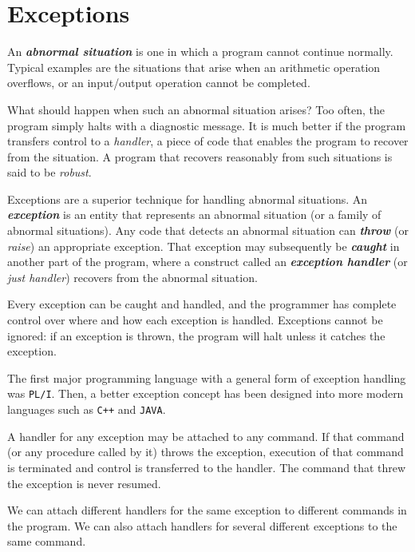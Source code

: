 \section{Exceptions}
\label{sec:exceptions}

An \textit{\textbf{abnormal situation}} is one in which a program cannot continue normally. Typical examples are the situations that arise when an arithmetic operation overflows, or an input/output operation cannot be completed.

What should happen when such an abnormal situation arises? Too often, the program simply halts with a diagnostic message. It is much better if the program transfers control to a \textit{handler}, a piece of code that enables the program to recover from the situation. A program that recovers reasonably from such situations is said to be \textit{robust}.

Exceptions are a superior technique for handling abnormal situations. An \textit{\textbf{exception}} is an entity that represents an abnormal situation (or a family of abnormal situations). Any code that detects an abnormal situation can \textit{\textbf{throw}} (or \textit{raise}) an appropriate exception. That exception may subsequently be \textit{\textbf{caught}} in another part of the program, where a construct called an \textit{\textbf{exception handler}} (or \textit{just handler}) recovers from the abnormal situation.

Every exception can be caught and handled, and the programmer has complete control over where and how each exception is handled. Exceptions cannot be ignored: if an exception is thrown, the program will halt unless it catches the exception.

The first major programming language with a general form of exception handling was \texttt{PL/I}. Then, a better exception concept has been designed into more modern languages such as \texttt{C++} and \texttt{JAVA}.

A handler for any exception may be attached to any command. If that command (or any procedure called by it) throws the exception, execution of that command is terminated and control is transferred to the handler. The command that threw the exception is never resumed.

We can attach different handlers for the same exception to different commands in the program. We can also attach handlers for several different exceptions to the same command.

